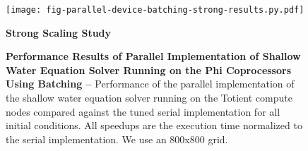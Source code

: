 
\begin{figure}[h]
    \centering
    \texttt{[image: fig-parallel-device-batching-strong-results.py.pdf]}
    \caption{\textbf{Strong Scaling Study}}
    \label{fig-parallel-device-batching-strong-results}
  \caption{\textbf{Performance Results of Parallel Implementation of
      Shallow Water Equation Solver Running on the Phi Coprocessors Using Batching --}
    Performance of the parallel implementation of the shallow water
    equation solver running on the Totient compute nodes compared against
    the tuned serial implementation for all initial conditions. All
    speedups are the execution time normalized to the serial
    implementation. We use an 800x800 grid.}

  \label{fig-parallel-device-batching-results}

\end{figure}

